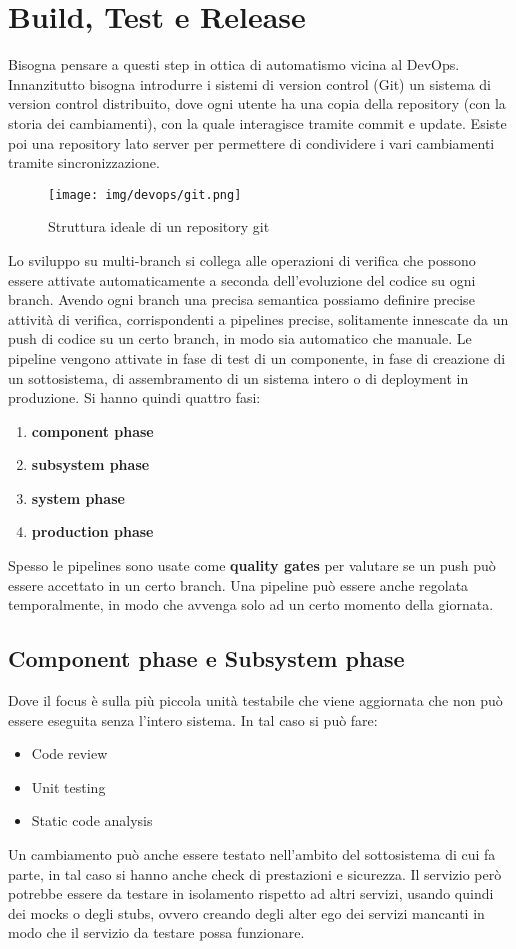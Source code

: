 \section{Build, Test e Release}
Bisogna pensare a questi step in ottica di automatismo vicina al DevOps.
Innanzitutto bisogna introdurre i sistemi di version control (Git) un sistema di
version control distribuito, dove ogni utente ha una copia della repository
(con la storia dei cambiamenti), con la quale interagisce tramite commit e update.
Esiste poi una repository lato server per permettere di condividere i vari
cambiamenti tramite sincronizzazione.
\begin{figure}[!ht]
      \centering
      \texttt{[image: img/devops/git.png]}
      \caption{Struttura ideale di un repository git}
      \label{fig:git}
\end{figure}
Lo sviluppo su multi-branch si collega alle operazioni di verifica che possono
essere attivate automaticamente a seconda dell'evoluzione del codice su ogni branch.
Avendo ogni branch una precisa semantica possiamo definire precise attività di
verifica, corrispondenti a pipelines precise, solitamente innescate da un push di
codice su un certo branch, in modo sia automatico che manuale.
Le pipeline vengono attivate in fase di test di un componente, in fase di creazione
di un sottosistema, di assembramento di un sistema intero o di deployment in
produzione. Si hanno quindi quattro fasi:
\begin{enumerate}
      \item \textbf{component phase}
      \item \textbf{subsystem phase}
      \item \textbf{system phase}
      \item \textbf{production phase}
\end{enumerate}
Spesso le pipelines sono usate come \textbf{quality gates} per valutare se un push
può essere accettato in un certo branch. Una pipeline può essere anche regolata
temporalmente, in modo che avvenga solo ad un certo momento della giornata.
\subsection{Component phase e Subsystem phase}
Dove il focus è sulla più piccola unità testabile che viene aggiornata che non
può essere eseguita senza l'intero sistema. In tal caso si può fare:
\begin{itemize}
      \item Code review
      \item Unit testing
      \item Static code analysis
\end{itemize}
Un cambiamento può anche essere testato nell'ambito del sottosistema di cui fa
parte, in tal caso si hanno anche check di prestazioni e sicurezza. Il servizio
però potrebbe essere da testare in isolamento rispetto ad altri servizi, usando
quindi dei mocks o degli stubs, ovvero creando degli alter ego dei servizi mancanti
in modo che il servizio da testare possa funzionare.
